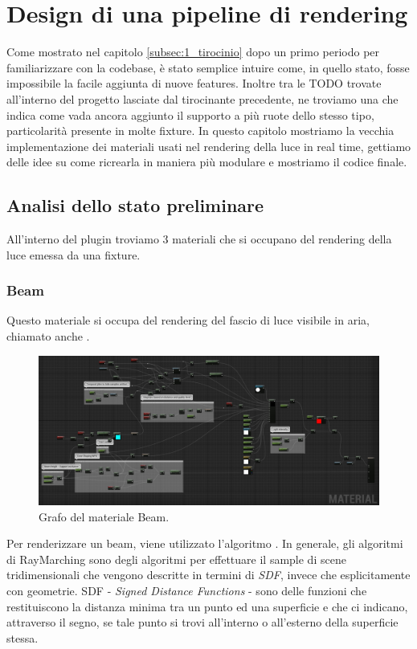 \documentclass[main.tex]{subfiles}
\begin{document}
\sloppy


\vspace{1.0cm}

\section{Design di una pipeline di rendering}\label{sec:RenderingPipeline}
Come mostrato nel capitolo \ref{subsec:1_tirocinio} dopo un primo periodo per familiarizzare con la codebase, è stato semplice intuire come, in quello stato, fosse impossibile la facile aggiunta di nuove features. Inoltre tra le TODO trovate all'interno del progetto lasciate dal tirocinante precedente, ne troviamo una che indica come vada ancora aggiunto il supporto a più ruote dello stesso tipo, particolarità presente in molte fixture. In questo capitolo mostriamo la vecchia implementazione dei materiali usati nel rendering della luce in real time, gettiamo delle idee su come ricrearla in maniera più modulare e mostriamo il codice finale.

\subsection{Analisi dello stato preliminare}\label{subsec:2_oldImplementation}
All'interno del plugin troviamo 3 materiali che si occupano del rendering della luce emessa da una fixture.
\subsubsection{Beam}\label{subsec:2_1_beam}
Questo materiale si occupa del rendering del fascio di luce visibile in aria, chiamato anche .
\begin{figure}[H]
    \centering
    \includegraphics[width=1\linewidth]{img/renderingPipeline/BeamMaterialFull.jpg}
    \caption{Grafo del materiale Beam.}
    \label{fig:2_beamGraphFull}
\end{figure}
\noindent Per renderizzare un beam, viene utilizzato l'algoritmo . In generale, gli algoritmi di RayMarching \cite{RayMarching} sono degli algoritmi per effettuare il sample di scene tridimensionali che vengono descritte in termini di \textit{SDF}, invece che esplicitamente con geometrie. SDF - \textit{Signed Distance Functions} - sono delle funzioni che restituiscono la distanza minima tra un punto ed una superficie e che ci indicano, attraverso il segno, se tale punto si trovi all'interno o all'esterno della superficie stessa.\newline
\end{document}
